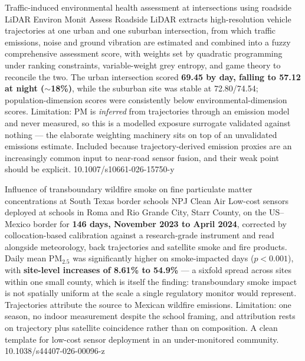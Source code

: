 \documentclass[10pt]{article}
\begin{document}
{Traffic-induced environmental health assessment at intersections using roadside LiDAR}
{Environ Monit Assess}
{Roadside LiDAR extracts high-resolution vehicle trajectories at one urban and one
suburban intersection, from which traffic emissions, noise and ground vibration are
estimated and combined into a fuzzy comprehensive assessment score, with weights set by
quadratic programming under ranking constraints, variable-weight grey entropy, and game
theory to reconcile the two. The urban intersection scored \textbf{69.45 by day, falling
to 57.12 at night ($\sim$18\%)}, while the suburban site was stable at 72.80/74.54;
population-dimension scores were consistently below environmental-dimension scores.
Limitation: PM is \emph{inferred} from trajectories through an emission model and never
measured, so this is a modelled exposure surrogate validated against nothing --- the
elaborate weighting machinery sits on top of an unvalidated emissions estimate. Included
because trajectory-derived emission proxies are an increasingly common input to near-road
sensor fusion, and their weak point should be explicit.}
{10.1007/s10661-026-15750-y}

\clearpage


{Influence of transboundary wildfire smoke on fine particulate matter concentrations at
South Texas border schools}
{NPJ Clean Air}
{Low-cost sensors deployed at schools in Roma and Rio Grande City, Starr County, on the
US--Mexico border for \textbf{146 days, November 2023 to April 2024}, corrected by
collocation-based calibration against a research-grade instrument and read alongside
meteorology, back trajectories and satellite smoke and fire products. Daily mean
PM$_{2.5}$ was significantly higher on smoke-impacted days ($p<0.001$), with
\textbf{site-level increases of 8.61\% to 54.9\%} --- a sixfold spread across sites within
one small county, which is itself the finding: transboundary smoke impact is not
spatially uniform at the scale a single regulatory monitor would represent. Trajectories
attribute the source to Mexican wildfire emissions. Limitation: one season, no indoor
measurement despite the school framing, and attribution rests on trajectory plus
satellite coincidence rather than on composition. A clean template for low-cost sensor
deployment in an under-monitored community.}
{10.1038/s44407-026-00096-z}
\end{document}

